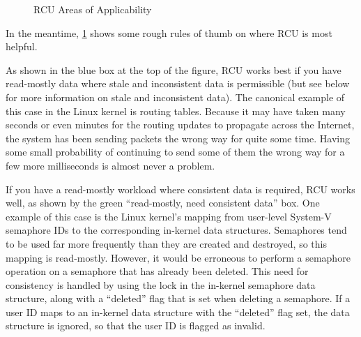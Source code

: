 \begin{figure}
\centering
{}
\caption{RCU Areas of Applicability}
\label{fig:defer:RCU Areas of Applicability}
\end{figure}

In the meantime,
\cref{fig:defer:RCU Areas of Applicability}
shows some rough rules of thumb on where RCU is most helpful.

As shown in the blue box at the top of the figure, RCU works best if
you have read-mostly data where stale and inconsistent
data is permissible (but see below for more information on stale and
inconsistent data).
The canonical example of this case in the Linux kernel is routing tables.
Because it may have taken many seconds or even minutes for the
routing updates to propagate across the Internet, the system
has been sending packets the wrong way for quite some time.
Having some small probability of continuing to send some of them the wrong
way for a few more milliseconds is almost never a problem.

If you have a read-mostly workload where consistent data is required,
RCU works well, as shown by the green ``read-mostly, need consistent data''
box.
One example of this case is the Linux kernel's mapping from user-level
System-V semaphore IDs to the corresponding in-kernel data structures.
Semaphores tend to be used far more frequently than they are created
and destroyed, so this mapping is read-mostly.
However, it would be erroneous to perform a semaphore operation on
a semaphore that has already been deleted.
This need for consistency is handled by using the lock in the
in-kernel semaphore data structure, along with a ``deleted''
flag that is set when deleting a semaphore.
If a user ID maps to an in-kernel data structure with the
``deleted'' flag set, the data structure is ignored, so that
the user ID is flagged as invalid.

